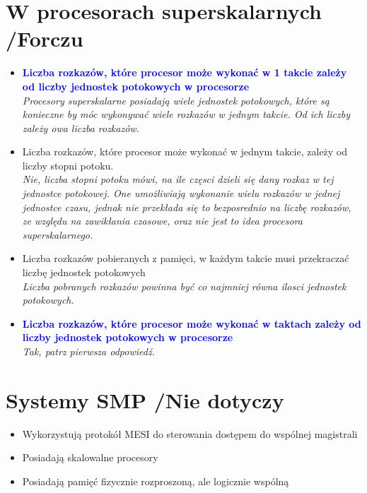 \section{W procesorach superskalarnych {\small /Forczu}}
	\begin{itemize}
    \item \textcolor{Blue}{\textbf{Liczba rozkazów, które procesor może wykonać w 1 takcie zależy od liczby jednostek potokowych w procesorze}}\\
    {\small \emph{Procesory superskalarne posiadają wiele jednostek potokowych, które są konieczne by móc wykonywać wiele rozkazów w jednym takcie. Od ich liczby zależy owa liczba rozkazów.}}
    \item Liczba rozkazów, które procesor może wykonać w jednym takcie, zależy od liczby stopni potoku.\\
    {\small \emph{Nie, liczba stopni potoku mówi, na ile częsci dzieli się dany rozkaz w tej jednostce potokowej. One umożliwiają wykonanie wielu rozkazów w jednej jednostce czasu, jednak nie przekłada się to bezposrednio na liczbę rozkazów, ze względu na zawikłania czasowe, oraz nie jest to idea procesora superskalarnego.}}
    \item Liczba rozkazów pobieranych z pamięci, w każdym takcie musi przekraczać liczbę jednostek potokowych\\
    {\small \emph{Liczba pobranych rozkazów powinna być co najmniej równa ilosci jednostek potokowych.}}
    \item \textcolor{Blue}{\textbf{Liczba rozkazów, które procesor może wykonać w taktach zależy od liczby jednostek potokowych w procesorze}}\\
    {\small \emph{Tak, patrz pierwsza odpowiedź.}}
    \end{itemize}

\section{Systemy SMP {\small /Nie dotyczy}}
	\begin{itemize}
    \item Wykorzystują protokół MESI do sterowania dostępem do wspólnej magistrali
    \item Posiadają skalowalne procesory
    \item Posiadają pamięć fizycznie rozproszoną, ale logicznie wspólną
    \end{itemize}

